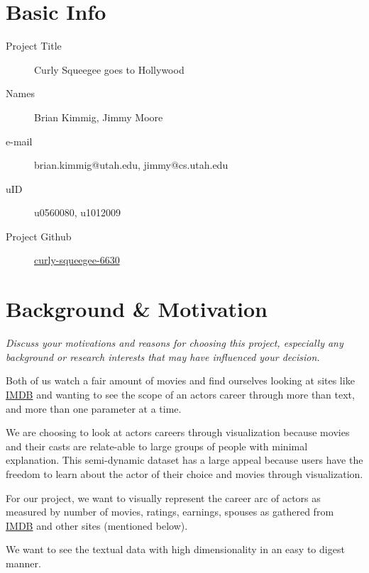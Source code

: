 \documentclass[12pt]{article}
\begin{document}
\section{Basic Info}
\begin{description}
    \item [Project Title]  Curly Squeegee goes to Hollywood 
    \item [Names]  Brian Kimmig, Jimmy Moore
    \item[e-mail] brian.kimmig@utah.edu, jimmy@cs.utah.edu
    \item [uID] u0560080, u1012009
    \item [Project Github] \href{https://github.com/bkimmig/curly-squeegee-6630}{curly-squeegee-6630}
\end{description}


\section{Background \& Motivation}
\textit{Discuss your motivations and reasons for choosing this project, especially any background or research interests that may have influenced your decision.}

Both of us watch a fair amount of movies and find ourselves looking at sites like \href{www.imdb.com}{IMDB} and wanting to see the scope of an actors career through more than text, and more than one parameter at a time.

We are choosing to look at actors careers through visualization because movies and their casts are relate-able to large groups of people with minimal explanation. This semi-dynamic dataset has a large appeal because users have the freedom to learn about the actor of their choice and movies through visualization. 

For our project, we want to visually represent the career arc of actors as measured by number of movies, ratings, earnings, spouses as gathered from \href{www.imdb.com}{IMDB} and other sites (mentioned below). 

We want to see the textual data with high dimensionality in an easy to digest manner.  
\end{document}
